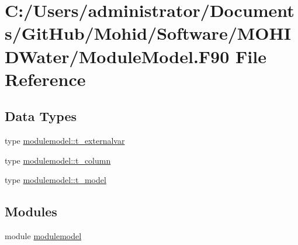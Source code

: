 \hypertarget{_module_model_8_f90}{}\section{C\+:/\+Users/administrator/\+Documents/\+Git\+Hub/\+Mohid/\+Software/\+M\+O\+H\+I\+D\+Water/\+Module\+Model.F90 File Reference}
\label{_module_model_8_f90}
\subsection*{Data Types}
\begin{DoxyCompactItemize}
\item 
type \mbox{\hyperlink{structmodulemodel_1_1t__externalvar}{modulemodel\+::t\+\_\+externalvar}}
\item 
type \mbox{\hyperlink{structmodulemodel_1_1t__column}{modulemodel\+::t\+\_\+column}}
\item 
type \mbox{\hyperlink{structmodulemodel_1_1t__model}{modulemodel\+::t\+\_\+model}}
\end{DoxyCompactItemize}
\subsection*{Modules}
\begin{DoxyCompactItemize}
\item 
module \mbox{\hyperlink{namespacemodulemodel}{modulemodel}}
\end{DoxyCompactItemize}
